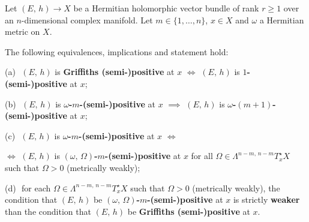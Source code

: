 \documentclass[12pt]{article}
\begin{document}
\begin{Obs}\label{Obs:m-pos_Griffiths-Nakano_comparison} Let $(E,\,h)\longrightarrow X$ be a Hermitian holomorphic vector bundle of rank $r\geq 1$ over an $n$-dimensional complex manifold. Let $m\in\{1,\dots , n\}$, $x\in X$ and $\omega$ a Hermitian metric on $X$.

  The following equivalences, implications and statement hold:

\vspace{1ex}  

\hspace{2ex} (a)\,\, $(E,\,h)$ is {\bf Griffiths (semi-)positive} at $x$ $\iff$ $(E,\,h)$ is {\bf $1$-(semi-)positive} at $x$;

\vspace{1ex}  

\hspace{2ex} (b)\,\, $(E,\,h)$ is {\bf $\omega$-$m$-(semi-)positive} at $x$ $\implies$ $(E,\,h)$ is {\bf $\omega$-$(m+1)$-(semi-)positive} at $x$;

\vspace{1ex}  

\hspace{2ex} (c)\,\, $(E,\,h)$ is {\bf $\omega$-$m$-(semi-)positive} at $x$ $\iff$ 

\noindent $\iff$ $(E,\,h)$ is {\bf $(\omega,\,\Omega)$-$m$-(semi-)positive} at $x$ for all $\Omega\in\Lambda^{n-m,\,n-m}T^\star_x X$ such that $\Omega> 0$ (metrically weakly);

\vspace{1ex}  

\hspace{2ex} (d)\,\, for each $\Omega\in\Lambda^{n-m,\,n-m}T^\star_x X$ such that $\Omega> 0$ (metrically weakly), the condition that $(E,\,h)$ be {\bf $(\omega,\,\Omega)$-$m$-(semi-)positive} at $x$ is strictly {\bf weaker} than the condition that  $(E,\,h)$ be {\bf Griffiths (semi-)positive} at $x$.


\end{Obs}  
\end{document}
